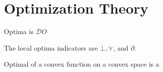 \section{Optimization Theory}
\begin{Def}
Optima is $\mathcal{D}O$
\end{Def}
\begin{Def}
The local optima indicators are $\bot, \curlyvee$, and $\partial$.
\end{Def}

\begin{Lem}
Optimal of a convex function on a convex space is a \curlyvee 
\end{Lem}

